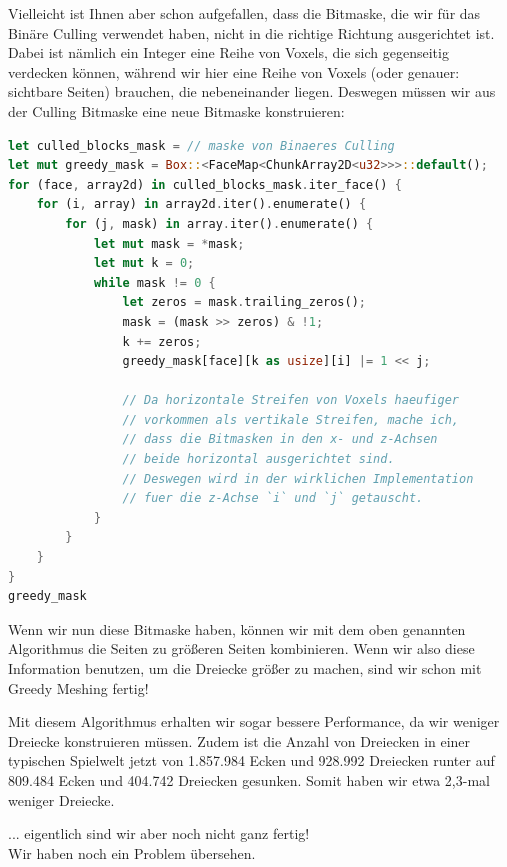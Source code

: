 Vielleicht ist Ihnen aber schon aufgefallen,
dass die Bitmaske, die wir für das Binäre Culling
verwendet haben, nicht in die richtige Richtung
ausgerichtet ist.
Dabei ist nämlich ein Integer eine Reihe von Voxels,
die sich gegenseitig verdecken können, während wir
hier eine Reihe von Voxels
(oder genauer: sichtbare Seiten)
brauchen, die nebeneinander liegen.
Deswegen müssen wir aus der Culling Bitmaske
eine neue Bitmaske konstruieren:

\begin{lstlisting}[language=Rust]
let culled_blocks_mask = // maske von Binaeres Culling
let mut greedy_mask = Box::<FaceMap<ChunkArray2D<u32>>>::default();
for (face, array2d) in culled_blocks_mask.iter_face() {
	for (i, array) in array2d.iter().enumerate() {
		for (j, mask) in array.iter().enumerate() {
			let mut mask = *mask;
			let mut k = 0;
			while mask != 0 {
				let zeros = mask.trailing_zeros();
				mask = (mask >> zeros) & !1;
				k += zeros;
				greedy_mask[face][k as usize][i] |= 1 << j;

				// Da horizontale Streifen von Voxels haeufiger
				// vorkommen als vertikale Streifen, mache ich,
				// dass die Bitmasken in den x- und z-Achsen
				// beide horizontal ausgerichtet sind.
				// Deswegen wird in der wirklichen Implementation
				// fuer die z-Achse `i` und `j` getauscht.
			}
		}
	}
}
greedy_mask
\end{lstlisting}

Wenn wir nun diese Bitmaske haben, können wir mit dem
oben genannten Algorithmus die Seiten zu größeren
Seiten kombinieren.
Wenn wir also diese Information benutzen,
um die Dreiecke größer zu machen, sind wir
schon mit Greedy Meshing fertig!

\vspace{0.5cm}


Mit diesem Algorithmus erhalten wir sogar bessere
Performance, da wir weniger Dreiecke konstruieren
müssen.
Zudem ist die Anzahl von Dreiecken in einer
typischen Spielwelt jetzt von
1.857.984 Ecken und 928.992 Dreiecken
runter auf 809.484 Ecken und 404.742 Dreiecken
gesunken.
Somit haben wir etwa 2,3-mal weniger Dreiecke.

\vspace{0.7cm}

{
	\setlength{\parindent}{0pt}
	... eigentlich sind wir aber noch nicht ganz fertig!\\
	Wir haben noch ein Problem übersehen.
}

